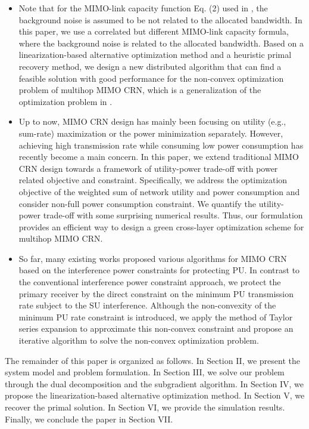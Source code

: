 \documentclass[12pt,onecolumn,tworows]{IEEEtran}
\begin{document}
\begin{itemize}
 \item Note that for the MIMO-link capacity function Eq. (2) used in \cite{LiuJSAC2008},
the background noise is assumed to be not related to the allocated bandwidth.
In this paper, we use a correlated but different MIMO-link capacity formula, where
the background noise is related to the allocated bandwidth.
Based on  a linearization-based alternative optimization method and a heuristic primal recovery method, we design a new distributed algorithm that can find a feasible solution with good performance for the non-convex optimization problem of multihop MIMO CRN, which is a generalization of the optimization problem in \cite{LiuJSAC2008}.


\item Up to now, MIMO CRN design has mainly been focusing on utility (e.g., sum-rate) maximization or the power minimization separately. However, achieving high transmission rate while consuming low power consumption has recently become a main concern. In this  paper, we extend traditional MIMO CRN design towards a framework of utility-power trade-off with power related objective and constraint. Specifically, we address the optimization objective of the weighted sum of network utility and power consumption and consider non-full power consumption constraint. We quantify the utility-power trade-off with some surprising numerical results. Thus, our formulation provides an efficient way to design a green cross-layer optimization scheme for multihop MIMO CRN.


\item So far, many existing works proposed various algorithms for MIMO CRN based on the interference power constraints for protecting PU. In contrast to the conventional interference power constraint approach, we protect the primary receiver by the direct constraint on the minimum PU transmission rate subject to the SU interference.
Although the non-convexity of the minimum PU rate constraint is introduced, we apply the method of Taylor series expansion to approximate this non-convex constraint and propose an iterative algorithm to solve the non-convex optimization problem.
                                                       \end{itemize}


The remainder of this paper is organized as follows. In Section II, we present the system model and problem formulation. In Section III, we solve our problem through the dual decomposition and the subgradient algorithm. In Section IV, we propose the linearization-based alternative optimization method. In Section V, we recover the primal solution. In Section VI, we provide the simulation results. Finally, we conclude the paper in Section VII.
\end{document}
